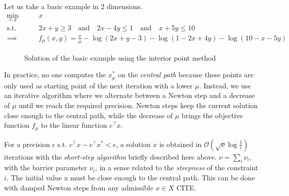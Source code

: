 \documentclass[11 pt]{report}
\begin{document}
Let us take a basic example in 2 dimensions.
\begin{equation*}
\begin{aligned}
    \min_{x,y} \qquad &x\\
    \text{s.t.} \qquad & 2x + y \geq 3 \quad\text{and}\quad 2x - 4y \leq 1 \quad\text{and}\quad x + 5y \leq 10\\
    \implies \qquad & f_{\mu}(x,y) = \frac{x}{\mu} - \log(2x+y-3) - \log(1-2x+4y) - \log(10 - x - 5y)
\end{aligned}
\end{equation*}

\begin{figure}[ht]
    \centering
    
    \caption{Solution of the basic example using the interior point method}
    \label{fig:interior_pt}
\end{figure}

In practice, no one computes the $x^*_{\mu}$ on the \textit{central path} because these points are only used as starting point of the next iteration with a lower $\mu$. Instead, we use an iterative algorithm where we alternate between a Newton step and a decrease of $\mu$ until we reach the required precision. Newton steps keep the current solution close enough to the central path, while the decrease of $\mu$ brings the objective function $f_{\mu}$ to the linear function $c^\top x$. 

For a precision $\epsilon$ s.t. $c^\top x - c^\top x^* < \epsilon$, a solution $x$ is obtained in $\mathcal{O}(\sqrt{\nu} \log \frac{1}{\epsilon})$ iterations with the \textit{short-step algorithm} briefly described here above. $\nu = \sum_{i} \nu_i$, with the barrier parameter $\nu_i$, in a sense related to the \textit{steepness} of the constraint $i$. The initial value x must be close enough to the central path. This can be done with damped Newton steps from any admissible $x \in X$ CITE.
\end{document}

